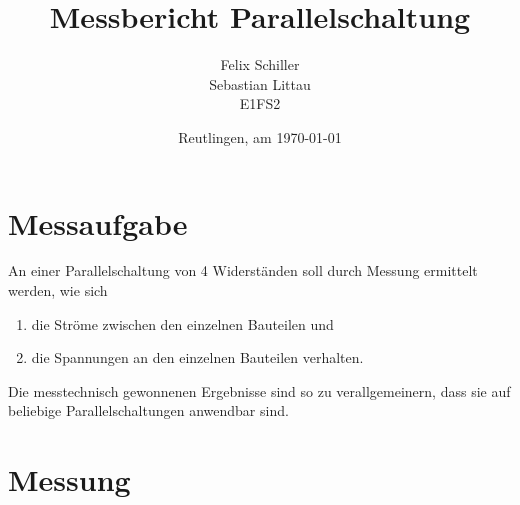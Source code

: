 \documentclass[
a4paper,     %
 headsepline, %
11pt         %
]{scrartcl}  %
\title{Messbericht Parallelschaltung}
\author{Felix Schiller \\ Sebastian Littau \\ E1FS2}
\date{Reutlingen, am \today{}}
\begin{document}

\maketitle

\newpage
\tableofcontents





\section{Messaufgabe}
An einer Parallelschaltung von 4 Widerständen soll durch Messung ermittelt werden, wie sich 
\begin{enumerate}
	\item die Ströme zwischen den einzelnen Bauteilen und 
	\item die Spannungen an den einzelnen Bauteilen verhalten. 
\end{enumerate}
Die messtechnisch gewonnenen Ergebnisse sind so zu verallgemeinern, dass sie auf beliebige Parallelschaltungen anwendbar sind.

\section{Messung}
\end{document}

